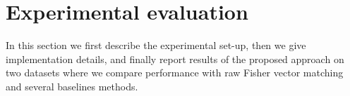 \documentclass[table]{article} %
\begin{document}








\section{Experimental evaluation}
\label{sec:exp}

	In this section we first describe the experimental set-up, then we give implementation details, and finally report results of the proposed approach on two datasets where we compare performance with raw Fisher vector matching and several baselines methods. %
\end{document}
